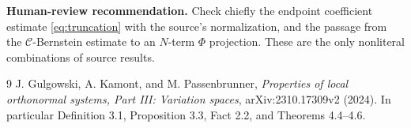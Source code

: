 \documentclass[10pt]{article}
\begin{document}
\noindent\textbf{Human-review recommendation.} Check chiefly the endpoint
coefficient estimate \eqref{eq:truncation} with the source's normalization,
and the passage from the $\mathscr C$-Bernstein estimate to an $N$-term
$\Phi$ projection.  These are the only nonliteral combinations of source
results.

\begin{thebibliography}{9}
J. Gulgowski, A. Kamont, and M. Passenbrunner,
\emph{Properties of local orthonormal systems, Part III: Variation spaces},
arXiv:2310.17309v2 (2024).  In particular Definition 3.1,
Proposition 3.3, Fact 2.2, and Theorems 4.4--4.6.
\end{thebibliography}
\end{document}
